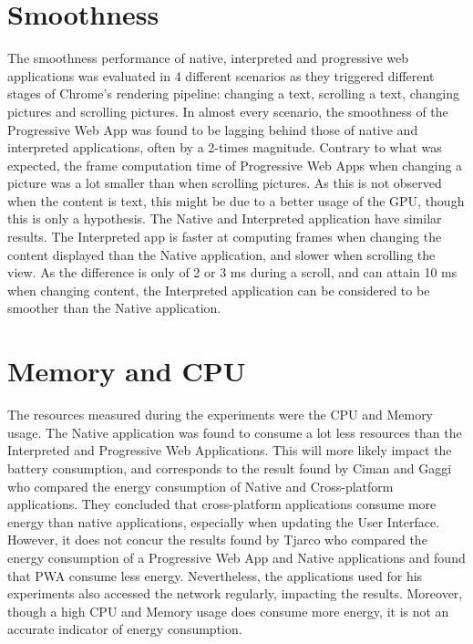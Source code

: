 \documentclass{kththesis}
\begin{document}
\section{Smoothness}
The smoothness performance of native, interpreted and progressive web applications was evaluated in 4 different scenarios as they triggered different stages of Chrome's rendering pipeline: changing a text, scrolling a text, changing pictures and scrolling pictures. In almost every scenario, the smoothness of the Progressive Web App was found to be lagging behind those of native and interpreted applications, often by a 2-times magnitude.\newline
Contrary to what was expected, the frame computation time of Progressive Web Apps when changing a picture was a lot smaller than when scrolling pictures. As this is not observed when the content is text, this might be due to a better usage of the GPU, though this is only a hypothesis. \newline
The Native and Interpreted application have similar results. The Interpreted app is faster at computing frames when changing the content displayed than the Native application, and slower when scrolling the view. As the difference is only of 2 or 3 ms during a scroll, and can attain 10 ms when changing content, the Interpreted application can be considered to be smoother than the Native application.


\section{Memory and CPU}
The resources measured during the experiments were the CPU and Memory usage. The Native application was found to consume a lot less resources than the Interpreted and Progressive Web Applications. This will more likely impact the battery consumption, and corresponds to the result found by Ciman and Gaggi \cite{ciman2017empirical} who compared the energy consumption of Native and Cross-platform applications. They concluded that cross-platform applications consume more energy than native applications, especially when updating the User Interface. However, it does not concur the results found by Tjarco \cite{PWAapplicability} who compared the energy consumption of a Progressive Web App and Native applications and found that PWA consume less energy. Nevertheless, the applications used for his experiments also accessed the network regularly, impacting the results. Moreover, though a high CPU and Memory usage does consume more energy, it is not an accurate indicator of energy consumption.
\end{document}

